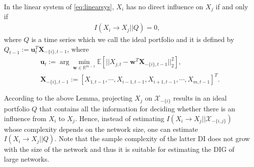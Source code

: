 \begin{lemma}\label{lemma:lin}
In the linear system of \eqref{eq:linearsys}, $X_i$ has no direct influence on $X_j$ if and only if
\begin{align}\label{eq:lemma_linear}
I(X_{i}\rightarrow X_j || Q) =0,
\end{align}
where $Q$ is a time series which we call the ideal portfolio and it is defined by
$Q_{t-1}:=\textbf{u}_t^T\textbf{X}_{-\{i\},t-1}$, where
\begin{align*}
&\textbf{u}_t:=\arg\min_{\textbf{w}\in\mathbb{R}^{m-1}}\mathbb{E}\left[||X_{j,t}- \textbf{w}^T \textbf{X}_{-\{i\},t-1}||_2^2\right],\\
&\textbf{X}_{-\{i\},t-1} :=[X_{1,t-1},\cdots, X_{i-1,t-1}, X_{i+1,t-1}, \cdots, X_{m,t-1} ]^T.
\end{align*}
\end{lemma}
According to the above Lemma, projecting $X_j$ on $\mathcal{X}_{-\{i\}}$ results in an ideal portfolio $Q$ that contains all the information for deciding whether there is an influence from $X_i$ to $X_j$.
Hence, instead of estimating $I(X_{i}\rightarrow X_j || \mathcal{X}_{-\{i,j\}})$ whose complexity depends on the network size, one can estimate $I(X_{i}\rightarrow X_j || Q)$.
Note that the sample complexity of the latter DI does not grow with the size of the network and thus it is suitable for estimating the DIG of large networks.


